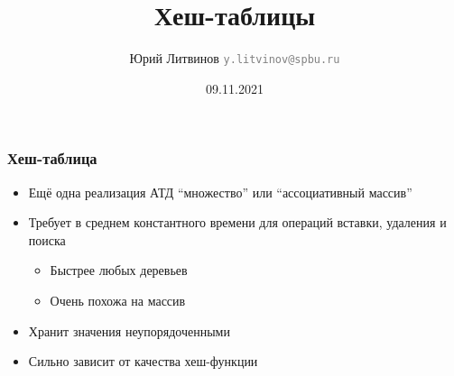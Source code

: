 \documentclass[xetex,mathserif,serif]{beamer}
\title{Хеш-таблицы}
\author[Юрий Литвинов]{Юрий Литвинов \newline \textcolor{gray}{\small\texttt{y.litvinov@spbu.ru}}}
\date{09.11.2021}
\begin{document}
    
    \frame{\titlepage}

    \begin{frame}
        \frametitle{Хеш-таблица}
        \begin{itemize}
            \item Ещё одна реализация АТД ``множество'' или ``ассоциативный массив''
            \item Требует в среднем константного времени для операций вставки, удаления и поиска
            \begin{itemize}
                \item Быстрее любых деревьев
                \item Очень похожа на массив
            \end{itemize}
            \item Хранит значения неупорядоченными
            \item Сильно зависит от качества хеш-функции
        \end{itemize}
    \end{frame}
\end{document}
